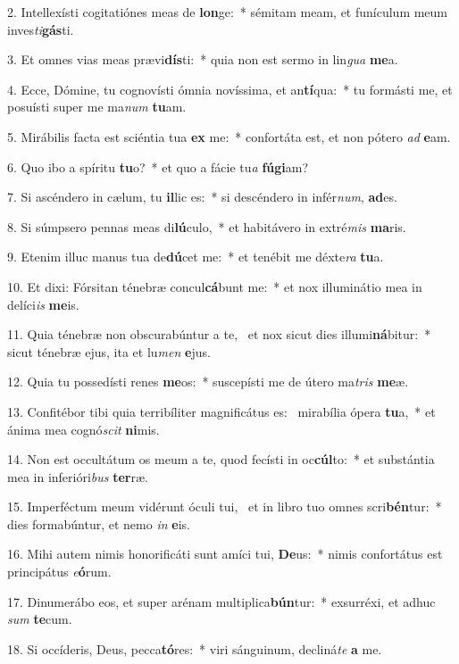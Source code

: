2. Intellexísti cogitatiónes meas de \textbf{lon}ge:~*  sémitam meam, et funículum meum inves\textit{ti}\textbf{gás}ti.\

3. Et omnes vias meas prævi\textbf{dís}ti:~*  quia non est sermo in lin\textit{gua} \textbf{me}a.\

4. Ecce, Dómine, tu cognovísti ómnia novíssima, et an\textbf{tí}qua:~*  tu formásti me, et posuísti super me ma\textit{num} \textbf{tu}am.\

5. Mirábilis facta est sciéntia tua \textbf{ex} me:~*  confortáta est, et non pótero \textit{ad} \textbf{e}am.\

6. Quo ibo a spíritu \textbf{tu}o?~*  et quo a fácie tu\textit{a} \textbf{fú}\textbf{gi}am?\

7. Si ascéndero in cælum, tu \textbf{il}lic es:~*  si descéndero in infér\textit{num}, \textbf{ad}es.\

8. Si súmpsero pennas meas di\textbf{lú}culo,~*  et habitávero in extré\textit{mis} \textbf{ma}ris.\

9. Etenim illuc manus tua de\textbf{dú}cet me:~*  et tenébit me déxte\textit{ra} \textbf{tu}a.\

10. Et dixi: Fórsitan ténebræ concul\textbf{cá}bunt me:~*  et nox illuminátio mea in delíci\textit{is} \textbf{me}is.\

11. Quia ténebræ non obscurabúntur a te, \dag\  et nox sicut dies illumi\textbf{ná}bitur:~*  sicut ténebræ ejus, ita et lu\textit{men} \textbf{e}jus.\

12. Quia tu possedísti renes \textbf{me}os:~*  suscepísti me de útero ma\textit{tris} \textbf{me}æ.\

13. Confitébor tibi quia terribíliter magnificátus es: \dag\  mirabília ópera \textbf{tu}a,~*  et ánima mea cognó\textit{scit} \textbf{ni}mis.\

14. Non est occultátum os meum a te, quod fecísti in oc\textbf{cúl}to:~*  et substántia mea in inferióri\textit{bus} \textbf{ter}ræ.\

15. Imperféctum meum vidérunt óculi tui, \dag\  et in libro tuo omnes scri\textbf{bén}tur:~*  dies formabúntur, et nemo \textit{in} \textbf{e}is.\

16. Mihi autem nimis honorificáti sunt amíci tui, \textbf{De}us:~*  nimis confortátus est principátus \textit{e}\textbf{ó}rum.\

17. Dinumerábo eos, et super arénam multiplica\textbf{bún}tur:~*  exsurréxi, et adhuc \textit{sum} \textbf{te}cum.\

18. Si occíderis, Deus, pecca\textbf{tó}res:~*  viri sánguinum, decliná\textit{te} \textbf{a} me.\


